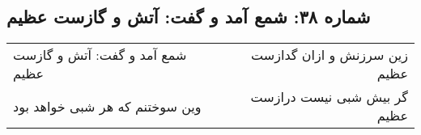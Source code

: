 \begin{center}
\section*{شماره ۳۸: شمع آمد و گفت: آتش و گازست عظیم}
\label{sec:038}
\begin{longtable}{l p{0.5cm} r}
شمع آمد و گفت: آتش و گازست عظیم
&&
زین سرزنش و ازان گدازست عظیم
\\
وین سوختنم که هر شبی خواهد بود
&&
گر بیش شبی نیست درازست عظیم
\\
\end{longtable}
\end{center}
